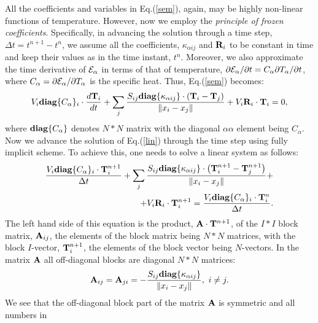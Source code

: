 All the coefficients and variables in Eq.(\ref{sem}), again, may be highly non-linear 
functions of 
temperature. However, now we employ the {\it principle 
of frozen coefficients}. Specifically, in advancing the solution 
through a time %
step, 
$\Delta t=t^{n+1}-t^n$, we assume all the coefficients, 
$\kappa_{\alpha ij}$ and ${\bf R}_i$ to be constant in time and keep their values as 
in the time instant, $t^n$. Moreover, we
also approximate the time derivative of ${\cal E}_\alpha$ in terms of that of 
temperature, 
$\partial{\cal E}_\alpha/\partial t = C_\alpha \partial T_\alpha/\partial t$, where 
$C_\alpha=\partial {\cal E}_\alpha/\partial T_\alpha$ is the specific heat. Thus, 
Eq.(\ref{sem}) becomes:
\begin{equation}\label{lin}
V_i{\bf diag}\{C_\alpha\}_i\cdot\frac{d{\bf T}_i}{d t} +\sum_j{\frac{S_{ij}
{\bf diag}\{\kappa_{\alpha ij}\}\cdot
\left({\bf T}_i-{\bf T}_j\right)}{\|x_i-x_j\|}}+V_i{\bf R}_i\cdot {\bf T}_i=0,
\end{equation}
where ${\bf diag}\{C_\alpha\}$ denotes $N*N$ matrix with the diagonal 
$\alpha\alpha$ element being  $C_\alpha$. %
Now we advance the solution of Eq.(\ref{lin}) through the time step using fully 
implicit scheme. To achieve this, one needs to solve a linear system as follows:
\begin{eqnarray}
\frac{V_i{\bf diag}\{C_\alpha\}_i
\cdot{\bf T}^{n+1}_i}{\Delta t}+\sum_j{\frac{S_{ij}
{\bf diag}\{\kappa_{\alpha ij}\}\cdot
\left({\bf T}^{n+1}_i-{\bf T}^{n+1}_j\right)}{\|x_i-x_j\|}}+\nonumber\\
+V_i{\bf R}_i\cdot {\bf T}^{n+1}_i
=\frac{V_i{\bf diag}\{C_\alpha\}_i\cdot{\bf T}^{n}_i}{\Delta t}.\label{alg}
\end{eqnarray}
The left hand side of this equation is the product, ${\bf A}\cdot{\bf T}^{n+1}$, of the $I*I$ block matrix, 
${\bf A}_{ij}$, the elements of the block matrix being $N*N$ matrices, with the block $I$-vector, 
${\bf T}^{n+1}_i$, the elements of the block vector being $N$-vectors. In the matrix ${\bf A}$ all 
off-diagonal blocks are diagonal $N*N$ matrices: 
\begin{equation}
{\bf A}_{ij}={\bf A}_{ji}=-\frac{S_{ij}
{\bf diag}\{\kappa_{\alpha ij}\}}{\|x_i-x_j\|},\,\,i\ne j.
\end{equation}
We see that the off-diagonal block part of the matrix ${\bf A}$ is symmetric and all numbers in 
